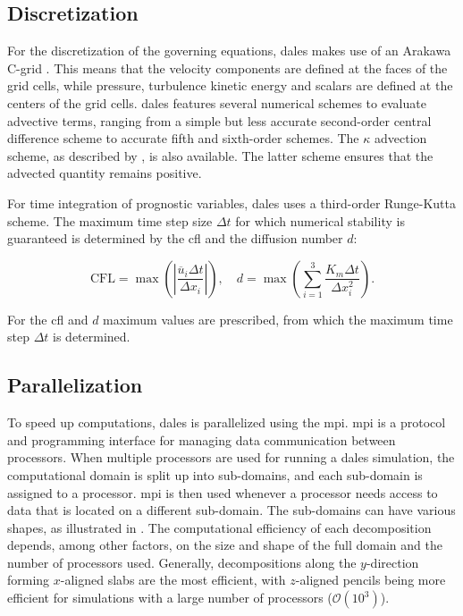 \subsection{Discretization}
For the discretization of the governing equations, \acrshort{dales} makes use of an Arakawa C-grid \citep{arakawaComputationalDesignBasic1977}. This means that the velocity components are defined at the faces of the grid cells, while pressure, turbulence kinetic energy and scalars are defined at the centers of the grid cells. \acrshort{dales} features several numerical schemes to evaluate advective terms, ranging from a simple but less accurate second-order central difference scheme to accurate fifth and sixth-order schemes. The $\kappa$ advection scheme, as described by \citet{hundsdorferPositiveFiniteDifferenceAdvection1995}, is also available. The latter scheme ensures that the advected quantity remains positive.

For time integration of prognostic variables, \acrshort{dales} uses a third-order Runge-Kutta scheme. The maximum time step size $\Delta t$ for which numerical stability is guaranteed is determined by the \acrfull{cfl} and the diffusion number $d$:

\begin{equation}
    \text{CFL} = \max \left( \left| \frac{\overline{u}_i \Delta t}{\Delta x_i} \right| \right), \quad d = \max \left( \sum_{i=1}^{3} \frac{K_m \Delta t}{\Delta x_i^2} \right).
\end{equation}

For the \acrshort{cfl} and $d$ maximum values are prescribed, from which the maximum time step $\Delta t$ is determined.

\subsection{Parallelization} \label{sec:dales_mpi}
To speed up computations, \acrshort{dales} is parallelized using the \acrfull{mpi}. \acrshort{mpi} is a protocol and programming interface for managing data communication between processors. When multiple processors are used for running a \acrshort{dales} simulation, the computational domain is split up into sub-domains, and each sub-domain is assigned to a processor. \acrshort{mpi} is then used whenever a processor needs access to data that is located on a different sub-domain. The sub-domains can have various shapes, as illustrated in . The computational efficiency of each decomposition depends, among other factors, on the size and shape of the full domain and the number of processors used. Generally, decompositions along the $y$-direction forming $x$-aligned slabs are the most efficient, with $z$-aligned pencils being more efficient for simulations with a large number of processors ($\mathcal{O}(10^3)$). 

